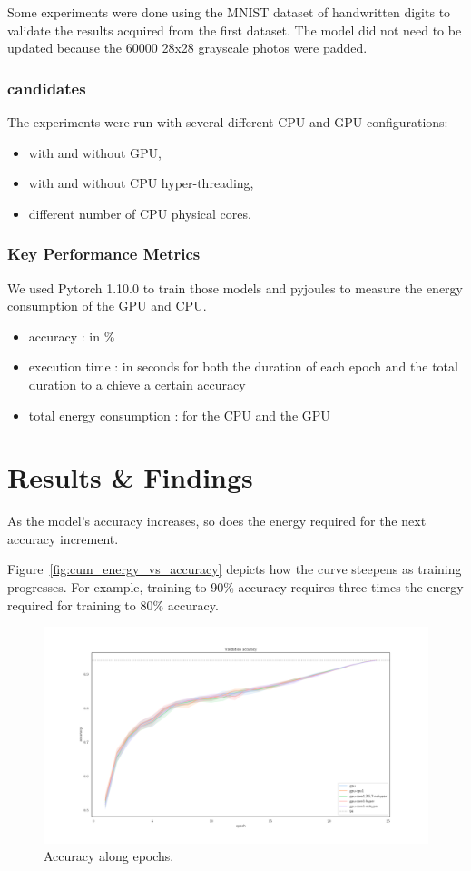 Some experiments were done using the MNIST dataset of handwritten digits to validate the results acquired from the first dataset.
The model did not need to be updated because the 60000 28x28 grayscale photos were padded.


\subsubsection{candidates}
The experiments were run with several different CPU and GPU configurations:
\begin{itemize}
    \item with and without GPU,
    \item with and without CPU hyper-threading,
    \item different number of CPU physical cores.
\end{itemize}

\subsubsection{Key Performance Metrics}
We used Pytorch 1.10.0 to train those models and pyjoules to measure the energy consumption of the GPU and CPU.
\begin{itemize}
    \item accuracy : in \%
    \item execution time : in seconds for both the duration of each epoch and the total duration to a chieve a certain accuracy
    \item total energy consumption : for the CPU and the  GPU
\end{itemize}


\section{Results \& Findings}
As the model's accuracy increases, so does the energy required for the next accuracy increment.

Figure~\ref{fig:cum_energy_vs_accuracy} depicts how the curve steepens as training progresses.
For example, training to 90\% accuracy requires three times the energy required for training to 80\% accuracy.

\begin{figure}
    \centering
    \includegraphics[width=\linewidth]{imgs/accuracy_basedonepoch}
    \caption{Accuracy along epochs.}
    \label{fig:p2}
\end{figure}

